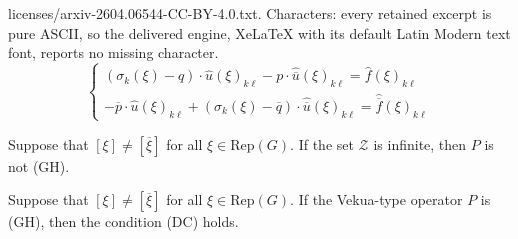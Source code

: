 \documentclass[10pt,a4paper]{amsart}
\begin{document}
licenses/arxiv-2604.06544-CC-BY-4.0.txt. Characters: every retained excerpt is pure ASCII, so the delivered engine, XeLaTeX with its default Latin Modern text font, reports no missing character.
\begin{equation}\label{subsystem}
	\left \{ \begin{array}{c} (\sigma_k(\xi)-q)\cdot \widehat{u}(\xi)_{k\ell}-p \cdot \widehat{\overline{u}}(\xi)_{k\ell}=\widehat{f}(\xi)_{k\ell} \\ -\overline{p} \cdot \widehat{u}(\xi)_{k\ell} + (\sigma_k(\xi)-\overline{q} ) \cdot \widehat{ \overline{u}}(\xi)_{k\ell} = \widehat{\overline{f}}(\xi)_{k\ell}   \end{array}   \right.
\end{equation}

\begin{proposition}\label{Zinfinite} Suppose that $[\xi] \neq [\overline{\xi}]$ for all $\xi \in \textrm{Rep}(G)$. If the set $\mathcal{Z}$ is infinite, then $P$ is not (GH).	
\end{proposition}  

\begin{proposition} Suppose that $[\xi] \neq [\overline{\xi}]$ for all $\xi \in \textrm{Rep}(G)$. If the Vekua-type operator $P$ is (GH), then the condition (DC) holds.
\end{proposition} 
\end{document}

